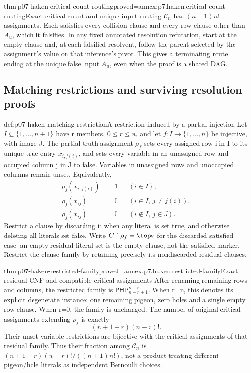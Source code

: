 \begin{hbtheorem}{thm:p07-haken-critical-count-routing}{proved=annex:p7.haken.critical-count-routing}{Exact critical count and unique-input routing}
\(\mathcal C_n\) has \((n+1)n!\) assignments. Each satisfies
every collision clause and every row clause other than \(A_u\),
which it falsifies. In any fixed annotated resolution refutation,
start at the empty clause and, at each falsified resolvent, follow
the parent selected by the assignment's value on that inference's
pivot. This gives a terminating route ending at the unique false
input \(A_u\), even when the proof is a shared DAG.
\end{hbtheorem}

\subsection{Matching restrictions and surviving resolution proofs}

\begin{hbdefinition}{def:p07-haken-matching-restriction}{A restriction induced by a partial injection}
Let \(I\subseteq\{1,\ldots,n+1\}\) have r members,
\(0\leq r\leq n\), and let
\(f:I\to\{1,\ldots,n\}\) be injective, with image J.
The partial truth assignment \(\rho_f\) sets every assigned
row i in I to its unique true entry \(x_{i,f(i)}\), and sets
every variable in an unassigned row and occupied column j in J
to false. Variables in unassigned rows and unoccupied columns
remain unset. Equivalently,
\[
\begin{aligned}
 \rho_f(x_{i,f(i)})&=1&& (i\in I),\\
 \rho_f(x_{ij})&=0&& (i\in I,\ j\ne f(i)),\\
 \rho_f(x_{ij})&=0&& (i\notin I,\ j\in J).
\end{aligned}
\]
Restrict a clause by discarding it when any literal is set true,
and otherwise deleting all literals set false. Write
\(C\upharpoonright\rho_f=\topv\) for the discarded satisfied
case; an empty residual literal set is the empty clause, not
the satisfied marker. Restrict the clause family by retaining
precisely its nondiscarded residual clauses.
\end{hbdefinition}

\begin{hbtheorem}{thm:p07-haken-restricted-family}{proved=annex:p7.haken.restricted-family}{Exact residual CNF and compatible critical assignments}
After renaming remaining rows and columns, the restricted family
is \(\mathsf{PHP}^{n-r}_{n-r+1}\). When r=n, this denotes its
explicit degenerate instance: one remaining pigeon, zero holes
and a single empty row clause. When r=0, the family is unchanged.
The number of original critical assignments extending \(\rho_f\)
is exactly
\[
 (n+1-r)(n-r)!.
\]
Their unset-variable restrictions are bijective with the critical
assignments of that residual family. Thus their fraction among
\(\mathcal C_n\) is
\((n+1-r)(n-r)!/((n+1)n!)\), not a product treating different
pigeon/hole literals as independent Bernoulli choices.
\end{hbtheorem}

